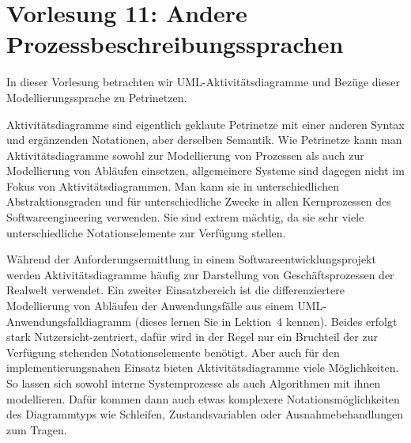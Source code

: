 \section{Vorlesung 11: Andere Prozessbeschreibungssprachen}

In dieser Vorlesung betrachten wir UML-Aktivitätsdiagramme und Bezüge dieser Modellierungssprache zu Petrinetzen.

Aktivitätsdiagramme 
sind eigentlich geklaute Petrinetze mit einer anderen Syntax und ergänzenden Notationen, aber derselben Semantik. Wie Petrinetze kann man Aktivitätsdiagramme sowohl zur Modellierung von Prozessen als auch zur Modellierung von Abläufen einsetzen, allgemeinere Systeme sind dagegen nicht im Fokus von Aktivitätsdiagrammen. Man kann sie in unterschiedlichen Abstraktionsgraden und für unterschiedliche Zwecke in allen Kernprozessen des Softwareengineering verwenden. Sie sind extrem mächtig, da sie sehr viele unterschiedliche Notationselemente zur Verfügung stellen.

Während der Anforderungsermittlung 
in einem Softwareentwicklungsprojekt werden Aktivitätsdiagramme häufig zur Darstellung von Geschäftsprozessen der Real\-welt verwendet. Ein zweiter Einsatzbereich ist die differenziertere Modellierung von Abläufen der Anwendungsfälle aus einem UML-Anwendungsfalldiagramm (dieses lernen Sie in Lektion~4 kennen). Beides erfolgt stark Nutzersicht-zentriert, dafür wird in der Regel nur ein Bruchteil der zur Verfügung stehenden Notationselemente benötigt. Aber auch für den implementierungsnahen Einsatz bieten Aktivitäts\-diagramme viele Möglichkeiten. So lassen sich sowohl interne Systemprozesse als auch Algorithmen mit ihnen modellieren. Dafür kommen dann auch etwas komplexere Notationsmöglichkeiten des Diagrammtyps wie Schleifen, Zustandsvariablen oder Ausnahmebehandlungen zum Tragen.


